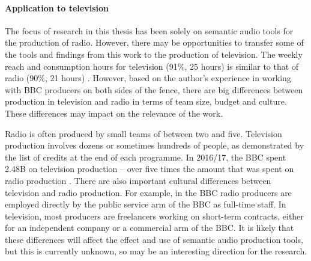 

\paragraph{Application to television}

The focus of research in this thesis has been solely on semantic audio tools for the production of radio. However,
there may be opportunities to transfer some of the tools and findings from this work to the production of television.
The weekly reach and consumption hours for television (91\%, 25 hours) is similar to that of radio (90\%, 21 hours)
\citep[p.  82, 119]{Ofcom2017}.  However, based on the author's experience in working with BBC producers on both sides
of the fence, there are big differences between production in television and radio in terms of team size, budget and
culture. These differences may impact on the relevance of the work.

Radio is often produced by small teams of between two and five. Television production involves dozens or sometimes
hundreds of people, as demonstrated by the list of credits at the end of each programme.  In 2016/17, the BBC spent
\textsterling2.48B on television production -- over five times the amount that was spent on radio production \citep[pp.
39, 111]{Ofcom2017}. There are also important cultural differences between television and radio production. For
example, in the BBC radio producers are employed directly by the public service arm of the BBC as full-time staff. In
television, most producers are freelancers working on short-term contracts, either for an independent company or a
commercial arm of the BBC. It is likely that these differences will affect the effect and use of semantic audio
production tools, but this is currently unknown, so may be an interesting direction for the research.


